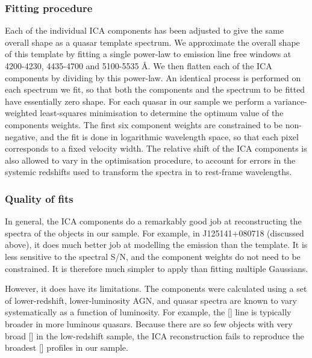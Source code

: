 \subsubsection{Fitting procedure}

Each of the individual ICA components has been adjusted to give the same overall shape as a quasar template spectrum. 
We approximate the overall shape of this template by fitting a single power-law to emission line free windows at 4200-4230, 4435-4700 and 5100-5535 \AA. 
We then flatten each of the ICA components by dividing by this power-law. 
An identical process is performed on each spectrum we fit, so that both the components and the spectrum to be fitted have essentially zero shape. 
For each quasar in our sample we perform a variance-weighted least-squares minimisation to determine the optimum value of the components weights.
The first six component weights are constrained to be non-negative, and the fit is done in logarithmic wavelength space, so that each pixel corresponds to a fixed velocity width.   
The relative shift of the ICA components is also allowed to vary in the optimisation procedure, to account for errors in the systemic redshifts used to transform the spectra in to rest-frame wavelengths. 

\subsubsection{Quality of fits}

In general, the ICA components do a remarkably good job at reconstructing the spectra of the objects in our sample. 
For example, in J125141+080718 (discussed above), it does much better job at modelling the  emission than the \citet{boroson92} template. 
It is less sensitive to the spectral S/N, and the component weights do not need to be constrained. 
It is therefore much simpler to apply than fitting multiple Gaussians. 

However, it does have its limitations. 
The components were calculated using a set of lower-redshift, lower-luminosity AGN, and quasar spectra are known to vary systematically as a function of luminosity. 
For example, the [] line is typically broader in more luminous quasars. 
Because there are so few objects with very broad [] in the low-redshift sample, the ICA reconstruction fails to reproduce the broadest [] profiles in our sample. 

